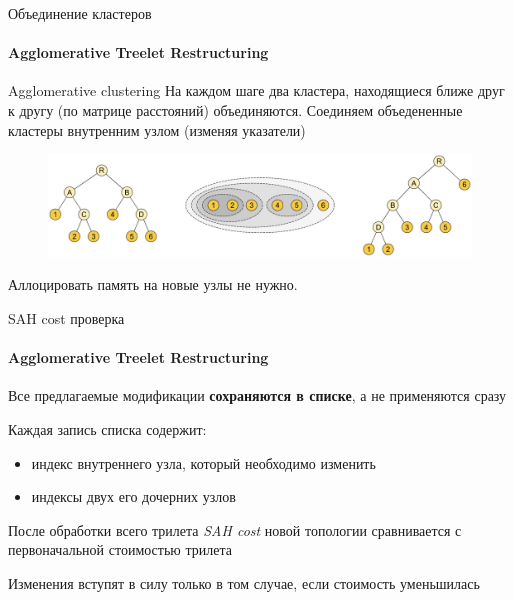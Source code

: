 \begin{frame}{Объединение кластеров}
    \framesubtitle{Agglomerative Treelet Restructuring}
    \begin{block}{Agglomerative clustering}
        На каждом шаге два кластера, находящиеся ближе друг к другу (по матрице расстояний) объединяются.
        Соединяем объедененные кластеры внутренним узлом (изменяя указатели)
    \end{block}

    \begin{figure}
        \includegraphics[keepaspectratio, width=\textwidth]{res/merge_treelets.png}
    \end{figure}

    Аллоцировать память на новые узлы не нужно.
\end{frame}

\begin{frame}[t]{SAH cost проверка}
    \framesubtitle{Agglomerative Treelet Restructuring}
    \begin{block}{}
        Все предлагаемые модификации \textbf{сохраняются в списке}, а не применяются сразу
    \end{block}
    Каждая запись списка содержит:
    \begin{itemize}
        \item 
            индекс внутреннего узла, который необходимо изменить
        \item 
            индексы двух его дочерних узлов
    \end{itemize}

    После обработки всего трилета \textit{SAH cost} новой топологии сравнивается
    с первоначальной стоимостью трилета
    \begin{block}{}
        Изменения вступят в силу только в том случае, если стоимость уменьшилась
    \end{block}

\end{frame}

